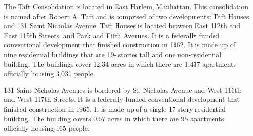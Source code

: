     

  

The Taft Consolidation is located in East Harlem, Manhattan. This consolidation is named after Robert A. Taft and is comprised of two developments: Taft Houses and 131 Saint Nicholas Avenue. Taft Houses is located between East 112th and East 115th Streets, and Park and Fifth Avenues. It is a federally funded conventional development that finished construction in 1962. It is made up of nine residential buildings that are 19- stories tall and one non-residential building. The buildings cover 12.34 acres in which there are 1,437 apartments officially housing 3,031 people.

131 Saint Nicholas Avenues is bordered by St. Nicholas Avenue and West 116th and West 117th Streets. It is a federally funded conventional development that finished construction in 1965. It is made up of  a single 17-story residential building. The building covers 0.67 acres in which there are 95 apartments officially housing 165 people.